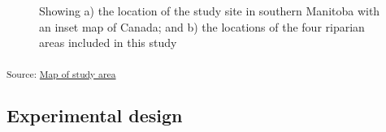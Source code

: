 \documentclass[
]{agujournal2019}
\begin{document}
\begin{figure}[H]


\caption{\label{fig-mapr}Showing a) the location of the study site in
southern Manitoba with an inset map of Canada; and b) the locations of
the four riparian areas included in this study}

\end{figure}%

\textsubscript{Source:
\href{https://alex-koiter.github.io/riparian-grazing-manuscript/notebooks/05_Map-preview.html\#cell-fig-mapr}{Map
of study area}}

\subsection{Experimental design}\label{experimental-design}
\end{document}
